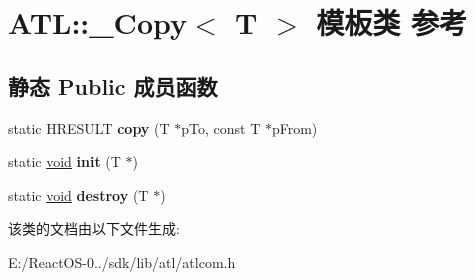 \hypertarget{class_a_t_l_1_1___copy}{}\section{A\+TL\+:\+:\+\_\+\+Copy$<$ T $>$ 模板类 参考}
\label{class_a_t_l_1_1___copy}
\subsection*{静态 Public 成员函数}
\begin{DoxyCompactItemize}
\item 
\mbox{\label{class_a_t_l_1_1___copy_a4c99a1788d7194952f4a9672aa40c636}} 
static H\+R\+E\+S\+U\+LT {\bfseries copy} (T $\ast$p\+To, const T $\ast$p\+From)
\item 
\mbox{\label{class_a_t_l_1_1___copy_aa90f34e75dd10c31227473e549befd15}} 
static \hyperlink{interfacevoid}{void} {\bfseries init} (T $\ast$)
\item 
\mbox{\label{class_a_t_l_1_1___copy_a0e14c1acb0c6947feaaf7e48861dc562}} 
static \hyperlink{interfacevoid}{void} {\bfseries destroy} (T $\ast$)
\end{DoxyCompactItemize}


该类的文档由以下文件生成\+:\begin{DoxyCompactItemize}
\item 
E\+:/\+React\+O\+S-\/0../sdk/lib/atl/atlcom.\+h\end{DoxyCompactItemize}
